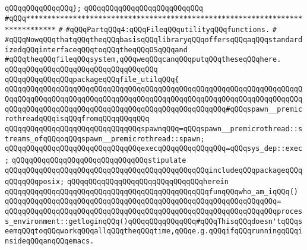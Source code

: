 \verb|qQQqqQQqqQQqqQQq};|\newline
\verb|qQQqqQQqqQQqqQQqqQQqqQQqqQQq|\newline
\verb|#qQQq*****************************************************************************|\newline
\verb|#|\newline
\verb|#qQQqPartqQQq4:qQQqFileqQQqutilityqQQqfunctions.|\newline
\verb|#|\newline
\verb|#qQQqNowqQQqthatqQQqtheqQQqbasisqQQqlibraryqQQqoffersqQQqaqQQqstandardizedqQQqinterfaceqQQqtoqQQqtheqQQqOSqQQqand|\newline
\verb|#qQQqtheqQQqfileqQQqsystem,qQQqweqQQqcanqQQqputqQQqtheseqQQqhere.|\newline
\newline
\verb|qQQqqQQqqQQqqQQqqQQqqQQqqQQqqQQqqQQq|\newline
\newline
\verb|qQQqqQQqqQQqqQQqpackageqQQqfile_utilqQQq{|\newline
\verb|qQQqqQQqqQQqqQQqqQQqqQQqqQQqqQQqqQQqqQQqqQQqqQQqqQQqqQQqqQQqqQQqqQQqqQQqqQQqqQQqqQQqqQQqqQQqqQQqqQQqqQQqqQQqqQQqqQQqqQQqqQQqqQQqqQQqqQQqqQQqqQQqqQQqqQQqqQQqqQQqqQQqqQQqqQQqqQQqqQQqqQQqqQQqqQQq#qQQqspawn__premicrothreadqQQqisqQQqfromqQQqqQQqqQQq|\newline
\newline
\verb|qQQqqQQqqQQqqQQqqQQqqQQqqQQqqQQqspawnqQQq=qQQqspawn__premicrothread::streams_ofqQQqoqQQqspawn__premicrothread::spawn;|\newline
\newline
\verb|qQQqqQQqqQQqqQQqqQQqqQQqqQQqqQQqexecqQQqqQQqqQQqqQQq=qQQqsys_dep::exec;|\newline
\newline
\verb|qQQqqQQqqQQqqQQqqQQqqQQqqQQqqQQqstipulate|\newline
\newline
\verb|qQQqqQQqqQQqqQQqqQQqqQQqqQQqqQQqqQQqqQQqqQQqqQQqincludeqQQqpackageqQQqqQQqqQQqposix;|\newline
\verb|qQQqqQQqqQQqqQQqqQQqqQQqqQQqqQQqherein|\newline
\verb|qQQqqQQqqQQqqQQqqQQqqQQqqQQqqQQqqQQqqQQqqQQqqQQqfunqQQqwho_am_iqQQq()|\newline
\verb|qQQqqQQqqQQqqQQqqQQqqQQqqQQqqQQqqQQqqQQqqQQqqQQqqQQqqQQqqQQqqQQq=|\newline
\verb|qQQqqQQqqQQqqQQqqQQqqQQqqQQqqQQqqQQqqQQqqQQqqQQqqQQqqQQqqQQqqQQqprocess_environment::getloginqQQq()qQQqqQQqqQQqqQQq#qQQqThisqQQqdoesn'tqQQqseemqQQqtoqQQqworkqQQqallqQQqtheqQQqtime,qQQqe.g.qQQqifqQQqrunningqQQqinsideqQQqanqQQqemacs.|\newline
